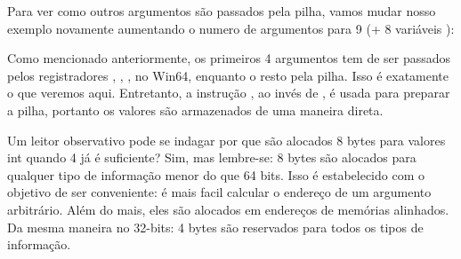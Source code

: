 
\label{example_printf8_x64}
Para ver como outros argumentos são passados pela pilha,
vamos mudar nosso exemplo novamente aumentando o numero de argumentos para 9 (\printf + 8 variáveis \Tint):




Como mencionado anteriormente, os primeiros 4 argumentos tem de ser passados pelos registradores \RCX, \RDX, ,  no Win64, enquanto o resto pela pilha.
Isso é exatamente o que veremos aqui.
Entretanto, a instrução \MOV, ao invés de \PUSH, é usada para preparar a pilha, portanto os valores são armazenados de uma maneira direta.



Um leitor observativo pode se indagar por que são alocados 8 bytes para valores int quando 4 já é suficiente?
Sim, mas lembre-se: 8 bytes são alocados para qualquer tipo de informação menor do que 64 bits.
Isso é estabelecido com o objetivo de ser conveniente: é mais facil calcular o endereço de um argumento arbitrário.
Além do mais, eles são alocados em endereços de memórias alinhados. Da mesma maneira no 32-bits: 4 bytes são reservados para todos os tipos de informação.


\PTBRph{}

